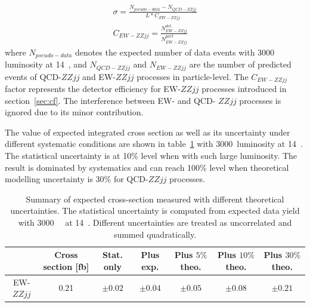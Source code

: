 \begin{equation}
\begin{split}
  \sigma = \frac{N_{pseudo-data} - N_{QCD-ZZjj}}{L*C_{EW-ZZjj}}\\
  C_{EW-ZZjj} = \frac{N_{EW-ZZjj}^{det.}}{N_{EW-ZZjj}^{part.}}
\end{split}
\end{equation}
where $N_{pseudo-data}$ denotes the expected number of data events with 3000~\ifb~ luminosity at 14~\tev,
and $N_{QCD-ZZjj}$ and $N_{EW-ZZjj}$ are the number of predicted events of QCD-$ZZjj$ and EW-$ZZjj$ processes in particle-level.
The $C_{EW-ZZjj}$ factor represents the detector efficiency for EW-$ZZjj$ processes introduced in section~\ref{sec:cf}.
The interference between EW- and QCD- $ZZjj$ processes is ignored due to its minor contribution.

The value of expected integrated cross section as well as its uncertainty under different systematic conditions are shown in table~\ref{tab:xsec}
with 3000~\ifb luminosity at 14~\tev.
The statistical uncertainty is at 10\% level when with such large luminosity.
The result is dominated by systematics and can reach 100\% level when theoretical modelling uncertainty is 30\% for QCD-$ZZjj$ processes.
\begin{table}[htbp]
  \footnotesize
  \centering
  \begin{tabular}{c|c|c|c|c|c|c}
    \hline
     & Cross section [fb] & Stat. only & Plus exp. & Plus $5\%$ theo. & Plus $10\%$ theo. & Plus $30\%$ theo. \\
    \hline
    EW-$ZZjj$ & 0.21 & $\pm0.02$ & $\pm0.04$ & $\pm0.05$ & $\pm 0.08$ & $\pm 0.21$ \\
    \hline
  \end{tabular}
  \caption{
  Summary of expected cross-section measured with different theoretical uncertainties.
  The statistical uncertainty is computed from expected data yield with 3000~\ifb~ at 14~\tev.
  Different uncertainties are treated as uncorrelated and summed quadratically.
  }
  \label{tab:xsec}
\end{table}

